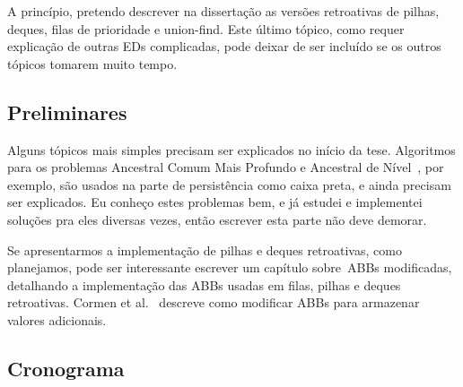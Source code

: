\documentclass[quali.tex]{subfile}
\begin{document}
A princípio, pretendo descrever na dissertação as versões retroativas de pilhas, deques, filas de prioridade e union-find. Este último tópico, como requer explicação de outras EDs complicadas, pode deixar de ser incluído se os outros tópicos tomarem muito tempo.

\subsection{Preliminares}

Alguns tópicos mais simples precisam ser explicados no início da tese. Algoritmos para os problemas
Ancestral Comum Mais Profundo e Ancestral de Nível~\cite{BenderM-F2004, Myers83}, %
por exemplo, são usados na parte de persistência como caixa preta, e ainda precisam ser explicados. Eu conheço estes problemas bem, e já estudei e implementei soluções pra eles diversas vezes, então escrever esta parte não deve demorar.

Se apresentarmos a implementação de pilhas e deques retroativas, como planejamos, pode ser interessante escrever um capítulo sobre~ABBs modificadas, detalhando a implementação das ABBs usadas em filas, pilhas e deques retroativas. Cormen et al.~\cite{CormenAugment} descreve como modificar ABBs para armazenar valores adicionais.

\subsection{Cronograma}

\newcommand{\n}[1]{\nref{#1}}
\newcommand{\s}{\surd}
\end{document}
